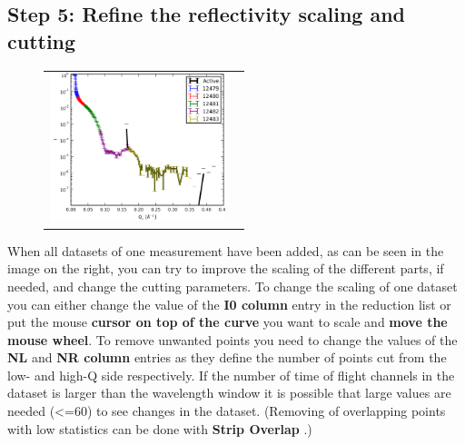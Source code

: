   \subsection{Step 5: Refine the reflectivity scaling and cutting}
  \label{sec:scaling}
    \begin{figure}
    \centering
    \begin{tabular}{cc}
     \includegraphics[width=145pt]{screenshots/cleanpoints.png} 
    \end{tabular}
    \end{figure}
    When all datasets of one measurement have been added, as can be seen in the image on the right, you can try to improve the scaling of the different parts, if needed, and change the cutting parameters.
    To change the scaling of one dataset you can either change the value of the \textbf{I0 column} entry in the reduction list or put the mouse \textbf{cursor on top of the curve} you want to scale and \textbf{move the mouse wheel}.
    To remove unwanted points you need to change the values of the \textbf{NL} and \textbf{NR column} entries as they define the number of points cut from the low- and high-Q side respectively.
    If the number of time of flight channels in the dataset is larger than the wavelength window it is possible that large values are needed (<=60) to see changes in the dataset. 
    (Removing of overlapping points with low statistics can be done with \textbf{Strip Overlap} .)
    
